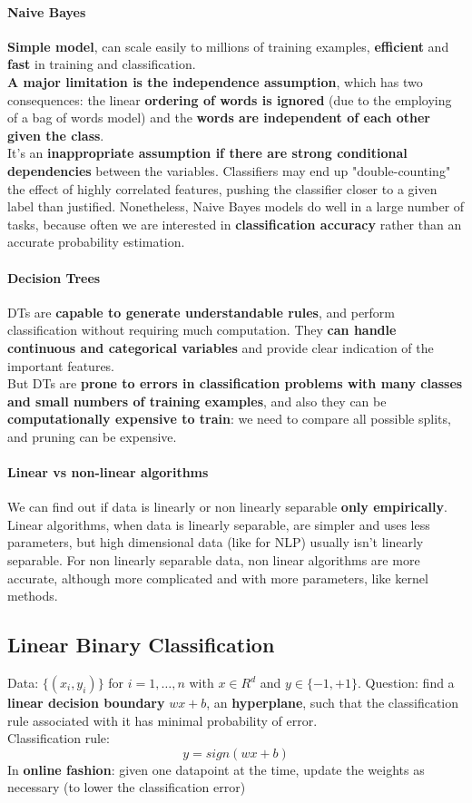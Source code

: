 \documentclass[10pt]{report}
\begin{document}
\paragraph{Naive Bayes} \textbf{Simple model}, can scale easily to millions of training examples, \textbf{efficient} and \textbf{fast} in training and classification.\\
\textbf{A major limitation is the independence assumption}, which has two consequences: the linear \textbf{ordering of words is ignored} (due to the employing of a bag of words model) and the \textbf{words are independent of each other given the class}.\\
It's an \textbf{inappropriate assumption if there are strong conditional dependencies} between the variables. Classifiers may end up "double-counting" the effect of highly correlated features, pushing the classifier closer to a given label than justified. Nonetheless, Naive Bayes models do well in a large number of tasks, because often we are interested in \textbf{classification accuracy} rather than an accurate probability estimation.
\paragraph{Decision Trees} DTs are \textbf{capable to generate understandable rules}, and perform classification without requiring much computation. They \textbf{can handle continuous and categorical variables} and provide clear indication of the important features.\\
But DTs are \textbf{prone to errors in classification problems with many classes and small numbers of training examples}, and also they can be \textbf{computationally expensive to train}: we need to compare all possible splits, and pruning can be expensive.
\paragraph{Linear vs non-linear algorithms} We can find out if data is linearly or non linearly separable \textbf{only empirically}.\\
Linear algorithms, when data is linearly separable, are simpler and uses less parameters, but high dimensional data (like for NLP) usually isn't linearly separable. For non linearly separable data, non linear algorithms are more accurate, although more complicated and with more parameters, like kernel methods.
\subsection{Linear Binary Classification}
Data: $\{(x_i,y_i)\}$ for $i=1,\ldots,n$ with $x \in R^d$ and $y \in \{-1,+1\}$. Question: find a \textbf{linear decision boundary} $wx + b$, an \textbf{hyperplane}, such that the classification rule associated with it has minimal probability of error.\\
Classification rule: $$y = sign(wx+b)$$
In \textbf{online fashion}: given one datapoint at the time, update the weights as necessary (to lower the classification error)
\end{document}
